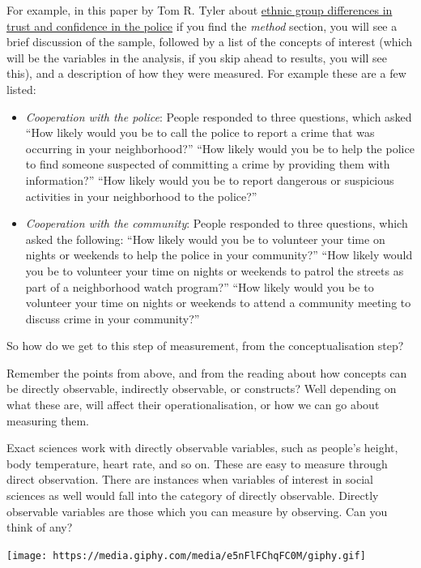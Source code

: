 \documentclass[
]{book}
\providecommand{\tightlist}{%
  \setlength{\itemsep}{0pt}\setlength{\parskip}{0pt}}
\begin{document}
For example, in this paper by Tom R. Tyler about \href{http://journals.sagepub.com/doi/abs/10.1177/1098611104271105}{ethnic group differences in trust and confidence in the police} if you find the \emph{method} section, you will see a brief discussion of the sample, followed by a list of the concepts of interest (which will be the variables in the analysis, if you skip ahead to results, you will see this), and a description of how they were measured. For example these are a few listed:

\begin{itemize}
\tightlist
\item
  \emph{Cooperation with the police}: People responded to three questions, which asked ``How likely would you be to call the police to report a crime that was occurring in your neighborhood?'' ``How likely would you be to help the police to find someone suspected of committing a crime by providing them with information?'' ``How likely would you be to report dangerous or suspicious activities in your neighborhood to the police?''
\item
  \emph{Cooperation with the community}: People responded to three questions, which asked the following: ``How likely would you be to volunteer your time on nights or weekends to help the police in your community?'' ``How likely would you be to volunteer your time on nights or weekends to patrol the streets as part of a neighborhood watch program?'' ``How likely would you be to volunteer your time on nights or weekends to attend a community meeting to discuss crime in your community?''
\end{itemize}

So how do we get to this step of measurement, from the conceptualisation step?

Remember the points from above, and from the reading about how concepts can be directly observable, indirectly observable, or constructs? Well depending on what these are, will affect their operationalisation, or how we can go about measuring them.

Exact sciences work with directly observable variables, such as people's height, body temperature, heart rate, and so on. These are easy to measure through direct observation. There are instances when variables of interest in social sciences as well would fall into the category of directly observable. Directly observable variables are those which you can measure by observing. Can you think of any?

\texttt{[image: https://media.giphy.com/media/e5nFlFChqFC0M/giphy.gif]}
\end{document}
